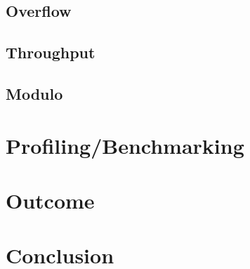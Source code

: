 \documentclass[a4paper]{article}
\begin{document}
\subsection{Overflow}
\subsection{Throughput}
\subsection{Modulo}

\section{Profiling/Benchmarking}

\section{Outcome}

\section{Conclusion}

\newpage
 
 
\nocite{*}
\end{document}
